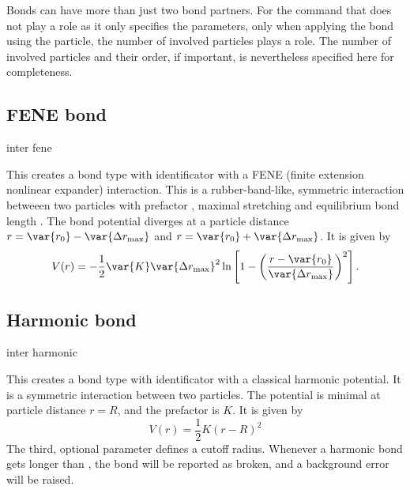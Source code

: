 Bonds can have more than just two bond partners. For the  command
that does not play a role as it only specifies the parameters, only when
applying the bond using the  particle, the number of involved
particles plays a role. The number of involved particles and their order, if
important, is nevertheless specified here for completeness.

\subsection{FENE bond}

\begin{essyntax}
  inter 
  fene
    
\end{essyntax}
This creates a bond type with identificator  with a
FENE (finite extension nonlinear expander) interaction. This is a
rubber-band-like, symmetric interaction betweeen two particles with
prefactor , maximal stretching  and
equilibrium bond length .  The bond potential diverges at a
particle distance $r=\var{r_0}-\var{\Delta r_\mathrm{max}}$ and
$r=\var{r_0}+\var{\Delta r_\mathrm{max}}$. It is given by
\begin{equation}
  V(r) = -\frac{1}{2} \var{K} \var{\Delta r_\mathrm{max}}^2\ln \left[ 1 - \left(
      \frac{r-\var{r_0}}{\var{\Delta r_\mathrm{max}}} \right)^2 \right].
\end{equation}

\subsection{Harmonic bond}

\begin{essyntax}
  inter 
  harmonic   
\end{essyntax}
This creates a bond type with identificator  with a
classical harmonic potential. It is a symmetric interaction between two
particles. The potential is minimal at particle distance $r=R$, and the
prefactor is $K$. It is given by
\begin{equation}
  V(r) = \frac{1}{2} K \left( r - R \right)^2
\end{equation}
The third, optional parameter  defines a cutoff
radius.  Whenever a harmonic bond gets longer than
, the bond will be reported as broken, and a
background error will be raised.

